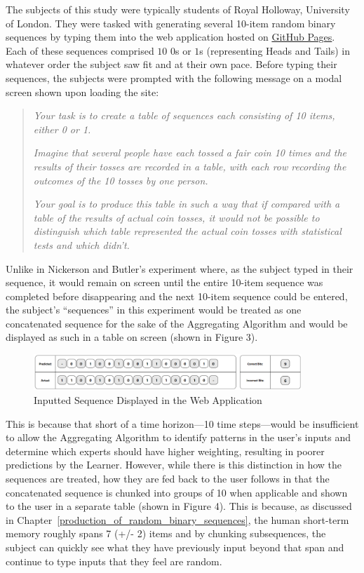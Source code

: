 The subjects of this study were typically students of Royal Holloway, University of London. They were tasked with generating several 10-item random binary sequences by typing them into the web application hosted on \href{https://arbarraclough.github.io/aggregating_algorithm/}{GitHub Pages}. Each of these sequences comprised $10$ $0$s or $1$s (representing Heads and Tails) in whatever order the subject saw fit and at their own pace. Before typing their sequences, the subjects were prompted with the following message on a modal screen shown upon loading the site:

\begin{quote}
    \textit{Your task is to create a table of sequences each consisting of 10 items, either 0 or 1.}
    
    \textit{Imagine that several people have each tossed a fair coin 10 times and the results of their tosses are recorded in a table, with each row recording the outcomes of the 10 tosses by one person.}
    
    \textit{Your goal is to produce this table in such a way that if compared with a table of the results of actual coin tosses, it would not be possible to distinguish which table represented the actual coin tosses with statistical tests and which didn't.}
\end{quote}

Unlike in Nickerson and Butler's experiment where, as the subject typed in their sequence, it would remain on screen until the entire 10-item sequence was completed before disappearing and the next 10-item sequence could be entered, the subject's ``sequences'' in this experiment would be treated as one concatenated sequence for the sake of the Aggregating Algorithm and would be displayed as such in a table on screen (shown in Figure 3).

\begin{figure}[h]
\centering
    \includegraphics[width=0.9\textwidth]{images/sequence_input.png}
    \caption{Inputted Sequence Displayed in the Web Application}
\end{figure}

This is because that short of a time horizon—10 time steps—would be insufficient to allow the Aggregating Algorithm to identify patterns in the user's inputs and determine which experts should have higher weighting, resulting in poorer predictions by the Learner. However, while there is this distinction in how the sequences are treated, how they are fed back to the user follows \cite{nickerson:2009} in that the concatenated sequence is chunked into groups of 10 when applicable and shown to the user in a separate table (shown in Figure 4). This is because, as discussed in Chapter~\ref{production_of_random_binary_sequences}, the human short-term memory roughly spans 7 (+/- 2) items and by chunking subsequences, the subject can quickly see what they have previously input beyond that span and continue to type inputs that they feel are random.


